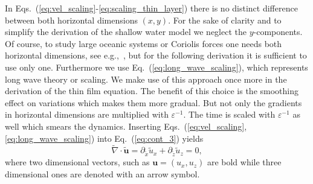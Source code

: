 In Eqs.~(\ref{eq:vel_scaling}-\ref{eq:scaling_thin_layer}) there is no distinct difference between both horizontal dimensions $(x,y)$. 
For the sake of clarity and to simplify the derivation of the shallow water model we neglect the $y$-components.
Of course, to study large oceanic systems or Coriolis forces one needs both horizontal dimensions, see e.g.,~\cite{dellarShallowWaterEquations2005, marcheDerivationNewTwodimensional2007}, but for the following derivation it is sufficient to use only one.
Furthermore we use Eq.~(\ref{eq:long_wave_scaling}), which represents long wave theory or scaling. 
We make use of this approach once more in the derivation of the thin film equation.
The benefit of this choice is the smoothing effect on variations which makes them more gradual. 
But not only the gradients in horizontal dimensions are multiplied with $\varepsilon^{-1}$.
The time is scaled with $\varepsilon^{-1}$ as well which smears the dynamics.
Inserting Eqs.~(\ref{eq:vel_scaling},\ref{eq:long_wave_scaling}) into Eq.~(\ref{eq:cont_3}) yields
\begin{equation}\label{eq:rescaled_cont}
    \tilde{\nabla}\cdot\tilde{\mathbf{u}} = \partial_{\tilde{x}} \tilde{u}_x + \partial_{\tilde{z}} \tilde{u}_z  = 0,
\end{equation}
where two dimensional vectors, such as $\mathbf{u} = (u_x, u_z)$ are bold while three dimensional ones are denoted with an arrow symbol.

